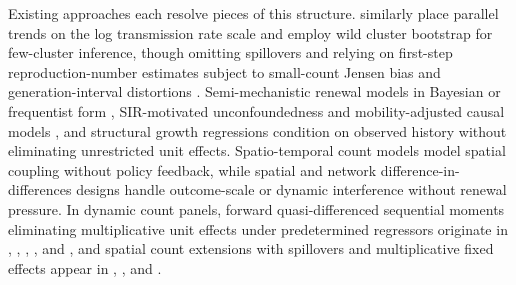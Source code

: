 Existing approaches each resolve pieces of this structure. \citet{feng2024parallel} similarly place
parallel trends on the log transmission rate scale and employ wild cluster bootstrap for few-cluster
inference, though omitting spillovers and relying on first-step reproduction-number estimates subject
to small-count Jensen bias and generation-interval distortions \citep{gostic2020practical,green2022heterogeneous}.
Semi-mechanistic renewal models in Bayesian \citep{flaxman2020npi,brauner2021npi,bhatt2023semimech}
or frequentist form \citep[including the sequential martingale-score variance argument in Proposition~5.8 of][]{bong2024frequentist,bong2024augmented},
SIR-motivated unconfoundedness and mobility-adjusted causal models \citep{callaway2023pandemic,bonvini2022mobility},
and structural growth regressions \citep{chernozhukov2021masks} condition on observed history without
eliminating unrestricted unit effects. Spatio-temporal count models
\citep{held2005hhh,meyer2014powerlaw,alaimo2024poissonar} model spatial coupling without policy feedback,
while spatial and network difference-in-differences designs
\citep{kosfeld2021spatial,butts2021spatial,forastiere2021network,hettinger2025doubly,xu2023did,xu2026dynamic,sun2025didnetwork}
handle outcome-scale or dynamic interference without renewal pressure. In dynamic count panels,
forward quasi-differenced sequential moments eliminating multiplicative unit effects under
predetermined regressors originate in \citet{chamberlain1992sequential},
\citet{wooldridge1997multiplicative}, \citet{windmeijer2000moment}, \citet{blundell2002count}, and
\citet{windmeijer2008gmm}, and spatial count extensions with spillovers and multiplicative fixed
effects appear in \citet{abdelmoula2007spatial}, \citet{schweikert2021copycat}, and
\citet{glaser2022spatial}.

